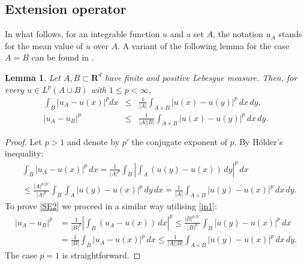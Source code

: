 \documentclass[11pt]{article}
\newcommand{\R}{\mathbf{R}}
\newtheorem{lemma}[theorem]{Lemma}
\theoremstyle{remark}
\begin{document}
\begin{appendices}
	


\section{Extension operator}\label{a1}

In what follows, for an integrable function $u$ and  a set $A$, the notation   $u_A$ stands for the mean value of   $u$ over $A$. A variant of the following lemma for the case $A=B$ can be found in \cite[Lemma 2.4]{BCE2021}.
\begin{lemma}\label{LSE}
	Let $A,B\subset \R^d$   have finite and positive Lebesgue measure. Then, for every $u\in L^p(A\cup B)$ with $1\leq p<\infty$,
	\begin{eqnarray*}
		\int_{B} |u_A-u(x)|^pdx &\leq& \frac{1}{|A|}\int_{A\times B} |u(x)-u(y)|^p\,dx\,dy, \\ \label{SE2}
		|u_A-u_B|^p &\leq& \frac{1}{|A||B|}\int_{A\times B} |u(x)-u(y)|^p\,dx\,dy.
	\end{eqnarray*}
\end{lemma}
\begin{proof}
	Let $p>1$ and denote by $p'$ the conjugate exponent of $p$. By H\"older's inequality:
	\begin{equation}	
	 \begin{aligned}\label{in1}
			&\int_B |u_A-u(x)|^p \,dx=\frac{1}{|A|^p}\int_B\left|\int_A (u(y)-u(x))\, dy \right|^p\,dx
			\\
			&\leq  \frac{|A|^{p/p'}}{|A|^p} \int_B \int_A |u(y)-u(x)|^p \,dy \,dx
	=\frac{1}{|A|} \int_{A \times B} |u(y)-u(x)|^p \,dx \,dy.
	\end{aligned}
\end{equation} 		
	To prove \eqref{SE2} we proceed in a similar way  utilising \eqref{in1}:
	\begin{align*}
		|u_A-u_B|^p&	= \frac{1}{|B|^p}\left| \int_B (u_A-u(x))\, dx \right|^p
		\leq  \frac{|B|^{p/p'}}{|B|^p} \int_B  |u(y)-u(x)|^p \,dx
		\\
		&=\frac{1}{|B|} \int_{B} |u_A-u(x)|^p \,dx
		\leq  \frac{1}{|A||B|} \int_{A \times B} |u(y)-u(x)|^p \,dx \,dy.
	\end{align*} 	
	The case $p=1$ is straightforward.
\end{proof} 	

\end{appendices}
\end{document}
